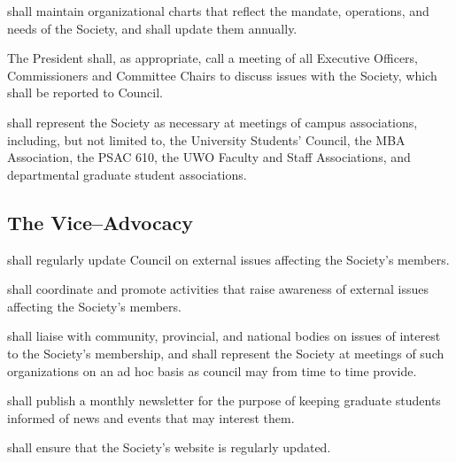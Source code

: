 \begin{longenum}[ label*=\thesubsection.\arabic*., align=left]
    \item shall maintain organizational charts that reflect the mandate, operations, and needs of the Society, and shall update them annually. 
    \item The President shall, as appropriate, call a meeting of all Executive Officers, Commissioners and Committee Chairs to discuss issues with the Society, which shall be reported to Council.
        \item shall represent the Society as necessary at meetings of campus associations, including, but not limited to, the University Students' Council, the MBA Association, the PSAC 610, the UWO Faculty and Staff Associations, and departmental graduate student associations. 
\end{longenum}

\subsection {The Vice--Advocacy}
\begin{longenum}[ label*=\thesubsection.\arabic*., align=left]
	\item shall regularly update Council on external issues affecting the Society's members.
    \item shall coordinate and promote activities that raise awareness of external issues affecting the Society's members.
    \item shall liaise with community, provincial, and national bodies on issues of interest to the Society's membership, and shall represent the Society at meetings of such organizations on an ad hoc basis as council may from time to time provide.
    \item shall publish a monthly newsletter for the purpose of keeping graduate students informed of news and events that may interest them.
    \item shall ensure that the Society's website is regularly updated.
\end{longenum}


